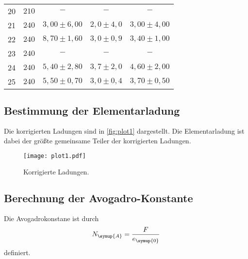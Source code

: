 \begin{table}
\begin{tabular}{c | c c c c}
    20 & $210$ & $-$              & $-$             & $-$               \\
    21 & $240$ & $3,00 \pm 6,00$  & $2,0 \pm 4,0$   & $3,00 \pm 4,00$   \\
    22 & $240$ & $8,70 \pm 1,60$  & $3,0 \pm 0,9$   & $3,40 \pm 1,00$   \\
    23 & $240$ & $-$              & $-$             & $-$               \\
    24 & $240$ & $5,40 \pm 2,80$  & $3,7 \pm 2,0$   & $4,60 \pm 2,00$   \\
    25 & $240$ & $5,50 \pm 0,70$  & $3,0 \pm 0,4$   & $3,70 \pm 0,50$   \\
    \bottomrule
  \end{tabular}
\end{table}

\subsection{Bestimmung der Elementarladung}
\label{sec:Elementarladung}
Die korrigierten Ladungen sind in \autoref{fig:plot1} dargestellt. Die Elementarladung ist dabei der größte
gemeinsame Teiler der korrigierten Ladungen.
\begin{figure}
  \centering
  \texttt{[image: plot1.pdf]}
  \caption{Korrigierte Ladungen.}
  \label{fig:plot1}
\end{figure}

\subsection{Berechnung der Avogadro-Konstante}
\label{sec:Avogadro}
Die Avogadrokonstane ist durch
\begin{align*}
  N_{\symup{A}} = \frac{F}{e_{\symup{0}}}
\end{align*}
definiert.